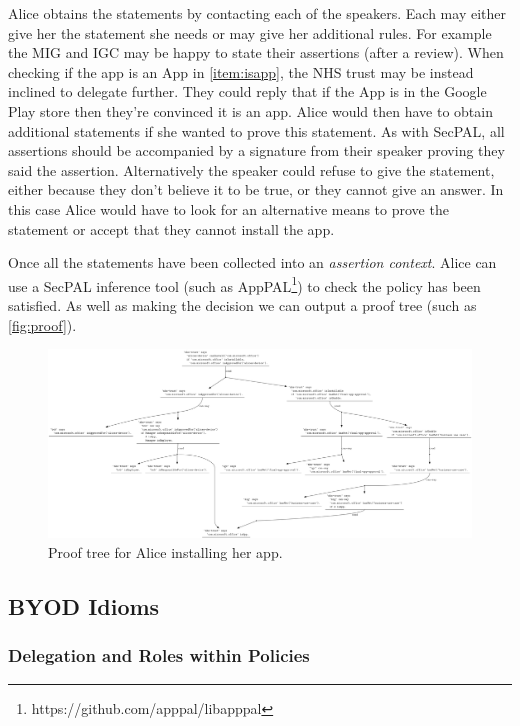 \documentclass{llncs}
\begin{document}
Alice obtains the statements by contacting each of the speakers. 
Each may either give her the statement she needs or may give her additional rules.
For example the MIG and IGC may be happy to state their assertions (after a review).
When checking if the app is an App in \autoref{item:isapp}, the NHS trust may be instead inclined to delegate further.
They could reply that if the App is in the Google Play store then they're convinced it is an app.
Alice would then have to obtain additional statements if she wanted to prove this statement.
As with SecPAL, all assertions should be accompanied by a signature from their speaker proving they said the assertion.
Alternatively the speaker could refuse to give the statement, either because they don't believe it to be true, or they cannot give an answer.
In this case Alice would have to look for an alternative means to prove the statement or accept that they cannot install the app.

Once all the statements have been collected into an \emph{assertion context}.
Alice can use a SecPAL inference tool (such as AppPAL\footnote{https://github.com/apppal/libapppal}) to check the policy has been satisfied.
As well as making the decision we can output a proof tree (such as \autoref{fig:proof}).

\begin{figure}\centering
  \includegraphics[width=\linewidth]{figures/proof.png}
  \caption{Proof tree for Alice installing her app.}
  \label{fig:proof}
\end{figure}

\subsection{BYOD Idioms}

\subsubsection{Delegation and Roles within Policies}
\end{document}
